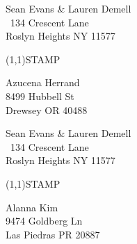 \documentclass[12pt]{article}
\begin{document}
\clearpage

\begin{minipage}{.5\linewidth} \noindent
Sean Evans \& Lauren Demell\\\ 
134 Crescent Lane\\ 
Roslyn Heights NY 11577
\end{minipage}
\begin{minipage}{.5\linewidth \hspace{-.2in} \vspace{-.3in}}
\begin{flushright}
\framebox(1,1){STAMP}
\end{flushright}
\end{minipage}

\begin{center} \begin{Huge} \vspace*{\fill}
Azucena Herrand\\
8499 Hubbell St\\
Drewsey OR 40488\\
\vspace{\fill} \end{Huge} \end{center}

\clearpage

\begin{minipage}{.5\linewidth} \noindent
Sean Evans \& Lauren Demell\\\ 
134 Crescent Lane\\ 
Roslyn Heights NY 11577
\end{minipage}
\begin{minipage}{.5\linewidth \hspace{-.2in} \vspace{-.3in}}
\begin{flushright}
\framebox(1,1){STAMP}
\end{flushright}
\end{minipage}

\begin{center} \begin{Huge} \vspace*{\fill}
Alanna Kim\\
9474 Goldberg Ln\\
Las Piedras PR 20887\\
\vspace{\fill} \end{Huge} \end{center}

\clearpage
\end{document}
